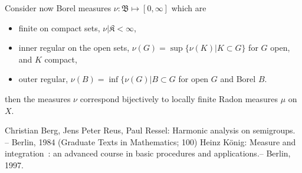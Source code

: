 \documentclass[12pt]{article}
\begin{document}
Consider now Borel measures $\nu : \mathfrak{B}\mapsto [0, \infty]$ which are
\begin{itemize}
\item finite on compact sets, $\nu|\mathfrak{K} <\infty$,
\item inner regular on the open sets, $\nu(G) = \sup \{\nu(K)|K\subset G\}$ for $G$ open, and $K$ compact,
\item outer regular, $\nu(B) = \inf \{\nu(G) | B\subset G$ for open $G$ and Borel $B$.
\end{itemize}
then the measures $\nu$ correspond bijectively to locally finite Radon measures $\mu$ on $X$. 











\begin{thebibliography}{99}
    Christian Berg, Jens Peter Reus, Paul Ressel: Harmonic analysis on semigroups. -- Berlin, 1984 (Graduate Texts in Mathematics; 100) 
    Heinz K\"onig: Measure and integration~: an advanced course in basic procedures and applications.-- Berlin, 1997. 
\end{thebibliography}
\end{document}
